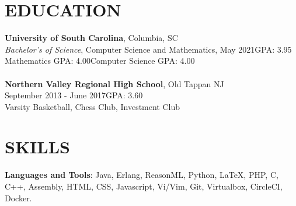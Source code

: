 \documentclass[margin]{res}
\begin{document}
\begin{resume}

\section{EDUCATION}
\textbf{University of South Carolina}, Columbia, SC\\
{\sl Bachelor's of Science}, Computer Science and Mathematics, May 2021\hfill GPA: 
3.95\\
Mathematics GPA: 4.00\hfill Computer Science GPA: 4.00\\\\
\textbf{Northern Valley Regional High School}, Old Tappan NJ\\
 September 2013 - June 2017\hfill GPA: 3.60\\
 Varsity Basketball, Chess Club, Investment Club


\section{SKILLS}

\textbf{Languages and Tools}: Java, Erlang, ReasonML, Python, \LaTeX, PHP, C, C++, Assembly, HTML, CSS, Javascript, Vi/Vim, Git, Virtualbox, CircleCI, Docker.
\\


\end{resume}
\end{document}
